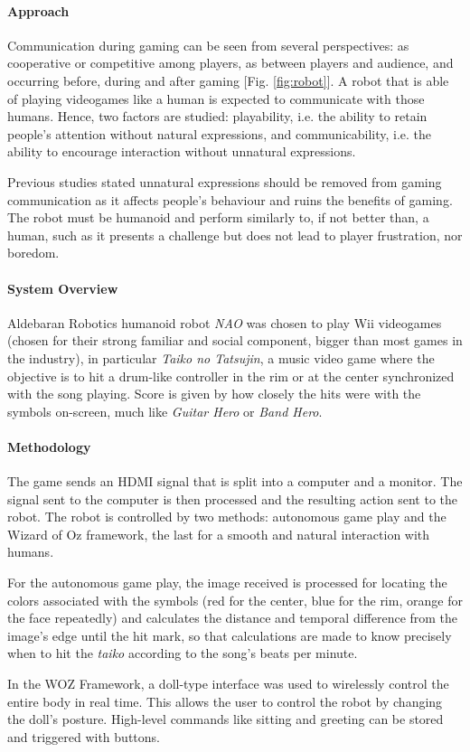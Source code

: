 \documentclass[runningheads]{llncs}
\begin{document}
\paragraph{Approach} Communication during gaming can be seen from several perspectives: as cooperative or competitive among players, as between players and audience, and occurring before, during and after gaming [Fig. \ref{fig:robot}]. A robot that is able of playing videogames like a human is expected to communicate with those humans. Hence, two factors are studied: playability, i.e. the ability to retain people's attention without natural expressions, and communicability, i.e. the ability to encourage interaction without unnatural expressions. \par Previous studies stated unnatural expressions should be removed from gaming communication as it affects people's behaviour and ruins the benefits of gaming. The robot must be humanoid and perform similarly to, if not better than, a human, such as it presents a challenge but does not lead to player frustration, nor boredom.

\paragraph{System Overview} Aldebaran Robotics humanoid robot \textit{NAO} was chosen to play Wii videogames (chosen for their strong familiar and social component, bigger than most games in the industry), in particular \textit{Taiko no Tatsujin}, a music video game where the objective is to hit a drum-like controller in the rim or at the center synchronized with the song playing. Score is given by how closely the hits were with the symbols on-screen, much like \textit{Guitar Hero} or \textit{Band Hero}.

\paragraph{Methodology} The game sends an HDMI signal that is split into a computer and a monitor. The signal sent to the computer is then processed and the resulting action sent to the robot. The robot is controlled by two methods: autonomous game play and the Wizard of Oz framework, the last for a smooth and natural interaction with humans.
\par For the autonomous game play, the image received is processed for locating the colors associated with the symbols (red for the center, blue for the rim, orange for the face repeatedly) and calculates the distance and temporal difference from the image's edge until the hit mark, so that calculations are made to know precisely when to hit the \textit{taiko} according to the song's beats per minute.
\par In the WOZ Framework, a doll-type interface was used to wirelessly control the entire body in real time. This allows the user to control the robot by changing the doll's posture. High-level commands like sitting and greeting can be stored and triggered with buttons.
\end{document}
